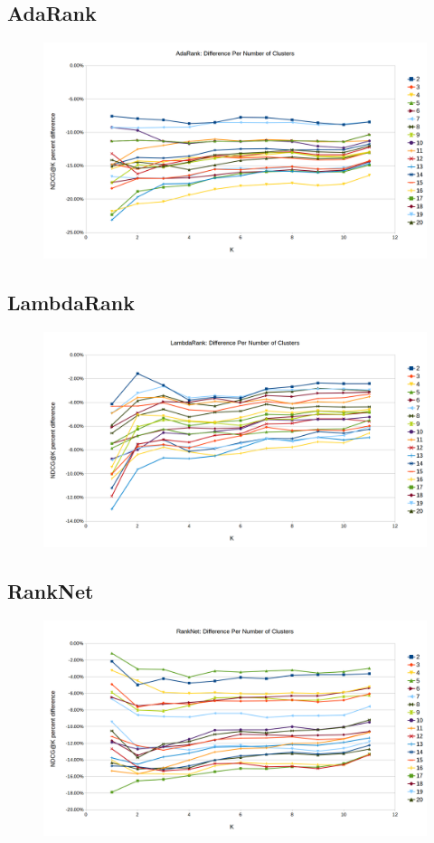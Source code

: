\documentclass{article}
\begin{document}
    \subsection{AdaRank}

    \begin{figure}[th!]
        \includegraphics[keepaspectratio=true,scale=0.35]{images/adarank_results.png}
    \end{figure}

    \subsection{LambdaRank}

    \begin{figure}[th!]
        \includegraphics[keepaspectratio=true,scale=0.35]{images/lambdarank_results.png}
    \end{figure}


    \subsection{RankNet}

    \begin{figure}[th!]
        \includegraphics[keepaspectratio=true,scale=0.35]{images/ranknet_results.png}
    \end{figure}
  
\end{document}
